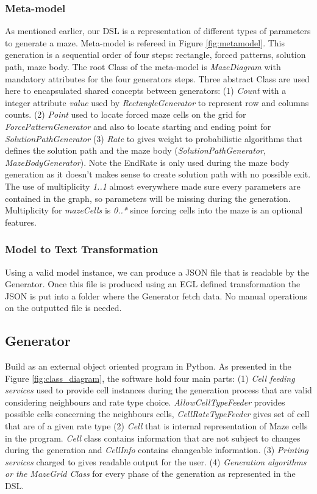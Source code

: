 \documentclass[review]{elsarticle}
\begin{document}
\subsubsection{Meta-model}
As mentioned earlier, our DSL is a representation of different types of parameters to generate a maze. Meta-model is refereed in Figure \ref{fig:metamodel}. This generation is a sequential order of four steps: rectangle, forced patterns, solution path, maze body. The root Class of the meta-model is \textit{MazeDiagram} with mandatory attributes for the four generators steps. Three abstract Class are used here to encapsulated shared concepts between generators: (1) \textit{Count} with a integer attribute \textit{value} used by \textit{RectangleGenerator} to represent row and columns counts. (2) \textit{Point} used to locate forced maze cells on the grid for \textit{ForcePatternGenerator} and also to locate starting and ending point for \textit{SolutionPathGenerator} (3) \textit{Rate} to gives weight to probabilistic algorithms that defines the solution path and the maze body (\textit{SolutionPathGenerator, MazeBodyGenerator}). Note the EndRate is only used during the maze body generation as it doesn't makes sense to create solution path with no possible exit. The use of multiplicity \textit{1..1} almost everywhere made sure every parameters are contained in the graph, so parameters will be missing during the generation. Multiplicity for \textit{mazeCells} is \textit{0..*} since forcing cells into the maze is an optional features.

\subsubsection{Model to Text Transformation }
Using a valid model instance, we can produce a JSON file that is readable by the Generator. Once this file is produced using an EGL defined transformation the JSON is put into a folder where the Generator fetch data. No manual operations on the outputted file is needed.

\subsection{Generator}
Build as an external object oriented program in Python. As presented in the Figure \ref{fig:class_diagram}, the software hold four main parts: (1) \textit{Cell feeding services} used to provide cell instances during the generation process that are valid considering neighbours and rate type choice. \textit{AllowCellTypeFeeder} provides possible cells concerning the neighbours cells, \textit{CellRateTypeFeeder} gives set of cell that are of a given rate type (2) \textit{Cell} that is internal representation of Maze cells in the program. \textit{Cell} class contains information that are not subject to changes during the generation and \textit{CellInfo} contains changeable information. (3) \textit{Printing services} charged to gives readable output for the user. (4) \textit{Generation algorithms or the MazeGrid Class} for every phase of the generation as represented in the DSL.
\end{document}
